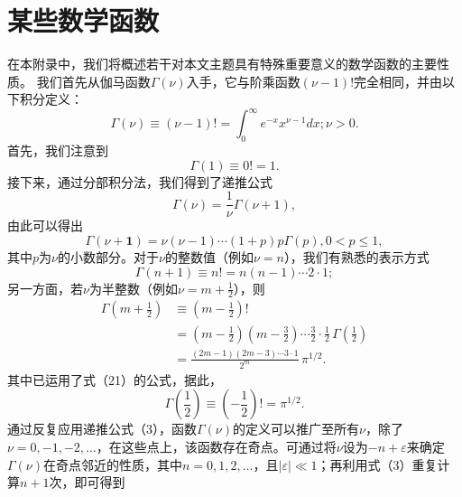 \section{某些数学函数}\label{b-ux67d0ux4e9bux6570ux5b66ux51fdux6570}
在本附录中，我们将概述若干对本文主题具有特殊重要意义的数学函数的主要性质。
我们首先从伽马函数\(\Gamma(\nu)\)入手，它与阶乘函数\((\nu - 1)!\)完全相同，并由以下积分定义：
\begin{equation}\tag{17.2.1}\label{eq:17.2.1}
\Gamma ( \nu ) \equiv ( \nu - 1 ) ! = \int _ { 0 } ^{\infty} e ^{- x} x ^{\nu - 1} d x ;  \nu > 0 .
\end{equation}
首先，我们注意到
\begin{equation}\tag{17.2.2}\label{eq:17.2.2}
\Gamma ( 1 ) \equiv 0 ! = 1 .
\end{equation}
接下来，通过分部积分法，我们得到了递推公式
\begin{equation}\tag{17.2.3}\label{eq:17.2.3}
\Gamma ( \nu ) = \frac { 1 } { \nu } \Gamma ( \nu + 1 ) ,
\end{equation}
由此可以得出
\begin{equation}\tag{17.2.4}\label{eq:17.2.4}
\Gamma ( \nu + \mathbf { 1 } ) = \nu ( \nu - 1 ) \cdots ( 1 + p ) p \Gamma ( p ) ,  0 < p \leq 1 ,
\end{equation}
其中\(p\)为\(\nu\)的小数部分。对于\(\nu\)的整数值（例如\(\nu=n\)），我们有熟悉的表示方式
\begin{equation}\tag{17.2.5}\label{eq:17.2.5}
\Gamma ( n + 1 ) \equiv n ! = n ( n - 1 ) \cdots 2 \cdot 1 ;
\end{equation}
另一方面，若\(\nu\)为半整数（例如\(\nu = m + \frac{1}{2}\)），则
\begin{equation}\tag{17.2.6}\label{eq:17.2.6}
\begin{aligned}
\Gamma\!\left(m+\frac{1}{2}\right)
&\equiv \left(m-\frac{1}{2}\right)! \\
&= \left(m-\frac{1}{2}\right)\left(m-\frac{3}{2}\right)\cdots\frac{3}{2}\cdot\frac{1}{2}\,
\Gamma\!\left(\frac{1}{2}\right) \\
&= \frac{(2m-1)(2m-3)\cdots3\cdot1}{2^m}\,\pi^{1/2}.
\end{aligned}
\end{equation}
其中已运用了式（21）的公式，据此，
\begin{equation}\tag{17.2.7}\label{eq:17.2.7}
\Gamma \left( \frac { 1 } { 2 } \right) \equiv \left( - \frac { 1 } { 2 } \right) ! = \pi ^{1 / 2} .
\end{equation}
通过反复应用递推公式（3），函数\(\Gamma(\nu)\)的定义可以推广至所有\(\nu\)，除了\(\nu=0, -1, -2, \ldots\)，在这些点上，该函数存在奇点。可通过将\(\nu\)设为\(-n+\varepsilon\)来确定\(\Gamma(\nu)\)在奇点邻近的性质，其中\(n=0, 1, 2, \ldots\)，且\(|\varepsilon| \ll 1\)；再利用式（3）重复计算\(n+1\)次，即可得到
